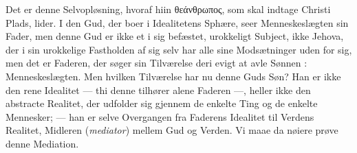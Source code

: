 \documentclass[12pt]{book}
\newcommand{\dsi}{\reflectbox{c}:}
\newcommand{\opage}[1]{\marginnote{\footnotesize\textit{[#1]}}}
\begin{document}
Det er denne Selvopløsning, hvoraf hiin θεάνθρωπος, som skal indtage Christi
Plads, lider. I den Gud, der boer i Idealitetens Sphære, seer Menneskeslægten
sin Fader, men denne Gud er ikke et i sig befæstet, urokkeligt Subject, ikke
Jehova, der i sin urokkelige Fastholden af sig selv har alle sine Modsætninger
uden for sig, men det er Faderen, der søger sin Tilværelse deri evigt at avle
Sønnen \dsi{} Menneskeslægten. Men hvilken Tilværelse har nu denne Guds Søn? Han
er ikke den rene Idealitet --- thi denne tilhører alene Faderen ---, heller ikke
den abstracte Realitet, der udfolder sig gjennem de enkelte Ting og de enkelte
Mennesker; --- han er selve Overgangen fra Faderens Idealitet til Verdens
Realitet,
\opage{140} Midleren (\textit{mediator}) mellem Gud og Verden. Vi maae da nøiere prøve denne
Mediation.
\end{document}
